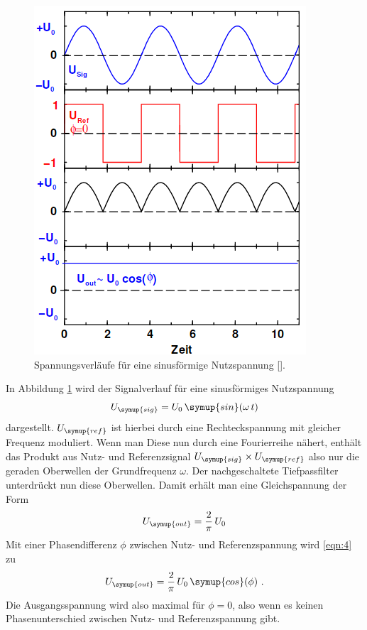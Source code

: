 \begin{figure}
  \centering
  \includegraphics[scale=0.4]{theorie.png}
  \caption{Spannungsverläufe für eine sinusförmige Nutzspannung [\cite{anleitung}].}
  \label{fig:1}
\end{figure}
In Abbildung \ref{fig:1} wird der Signalverlauf für eine sinusförmiges Nutzspannung
\begin{equation*}
    U_{\symup{sig}} = U_0 \, \symup{sin}(\omega \, t)
\end{equation*}
dargestellt. $U_{\symup{ref}}$ ist hierbei durch eine Rechteckspannung mit gleicher Frequenz
moduliert. Wenn man Diese nun durch eine Fourierreihe nähert, enthält das Produkt
aus Nutz- und Referenzsignal $U_{\symup{sig}} \times U_{\symup{ref}}$ also nur die geraden Oberwellen
der Grundfrequenz $\omega$. %
Der nachgeschaltete Tiefpassfilter unterdrückt nun diese Oberwellen. Damit erhält
man eine Gleichspannung der Form
\begin{equation}
    U_{\symup{out}} = \frac{2}{\pi} \, U_0
    \label{eqn:4}
\end{equation}
Mit einer Phasendifferenz $\phi$ zwischen Nutz- und Referenzspannung wird
\eqref{eqn:4} zu
\begin{equation}
  U_{\symup{out}} = \frac{2}{\pi} \, U_0 \, \symup{cos}(\phi) \ .
  \label{eqn:5}
\end{equation}
Die Ausgangsspannung wird also maximal für $\phi = 0$, also wenn es keinen Phasenunterschied
zwischen Nutz- und Referenzspannung gibt.

